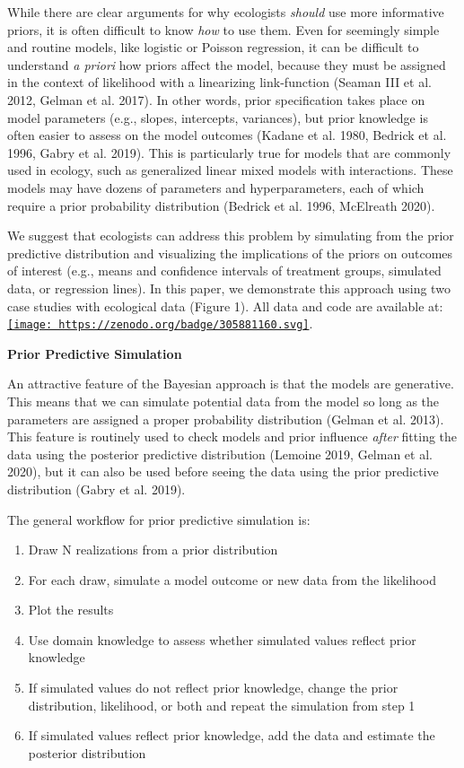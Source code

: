\documentclass[
  12pt,
]{article}
\begin{document}
While there are clear arguments for why ecologists \emph{should} use
more informative priors, it is often difficult to know \emph{how} to use
them. Even for seemingly simple and routine models, like logistic or
Poisson regression, it can be difficult to understand \emph{a priori}
how priors affect the model, because they must be assigned in the
context of likelihood with a linearizing link-function (Seaman III et
al. 2012, Gelman et al. 2017). In other words, prior specification takes
place on model parameters (e.g., slopes, intercepts, variances), but
prior knowledge is often easier to assess on the model outcomes (Kadane
et al. 1980, Bedrick et al. 1996, Gabry et al. 2019). This is
particularly true for models that are commonly used in ecology, such as
generalized linear mixed models with interactions. These models may have
dozens of parameters and hyperparameters, each of which require a prior
probability distribution (Bedrick et al. 1996, McElreath 2020).

We suggest that ecologists can address this problem by simulating from
the prior predictive distribution and visualizing the implications of
the priors on outcomes of interest (e.g., means and confidence intervals
of treatment groups, simulated data, or regression lines). In this
paper, we demonstrate this approach using two case studies with
ecological data (Figure 1). All data and code are available at:
\href{https://zenodo.org/badge/latestdoi/305881160}{\texttt{[image: https://zenodo.org/badge/305881160.svg]}}.

\textbf{Prior Predictive Simulation}

An attractive feature of the Bayesian approach is that the models are
generative. This means that we can simulate potential data from the
model so long as the parameters are assigned a proper probability
distribution (Gelman et al. 2013). This feature is routinely used to
check models and prior influence \emph{after} fitting the data using the
posterior predictive distribution (Lemoine 2019, Gelman et al. 2020),
but it can also be used before seeing the data using the prior
predictive distribution (Gabry et al. 2019).

The general workflow for prior predictive simulation is:

\begin{enumerate}
\def\labelenumi{\arabic{enumi})}
\item
  Draw N realizations from a prior distribution
\item
  For each draw, simulate a model outcome or new data from the
  likelihood
\item
  Plot the results
\item
  Use domain knowledge to assess whether simulated values reflect prior
  knowledge
\item
  If simulated values do not reflect prior knowledge, change the prior
  distribution, likelihood, or both and repeat the simulation from step
  1
\item
  If simulated values reflect prior knowledge, add the data and estimate
  the posterior distribution
\end{enumerate}
\end{document}

